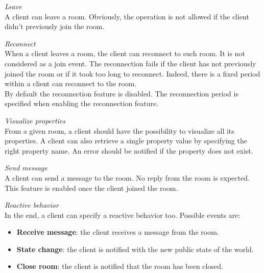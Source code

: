 \bigskip
\textit{Leave}
\\
A client can leave a room. Obviously, the operation is not allowed if the client didn't previously join the room. 

\bigskip
\textit{Reconnect}
\\
When a client leaves a room, the client can reconnect to such room. It is not considered as a join event.
The reconnection fails if the client has not previously joined the room or if it took too long to reconnect. Indeed, there is a fixed period within a client can reconnect to the room.
\\
By default the reconnection feature is disabled. The reconnection period is specified when enabling the reconnection feature.

\bigskip
\textit{Visualize properties}
\\
From a given room, a client should have the possibility to visualize all its properties. A client can also retrieve a single property value by specifying the right property name. An error should be notified if the property does not exist.

\bigskip
\textit{Send message}
\\
A client can send a message to the room. No reply from the room is expected.
This feature is enabled once the client joined the room.

\bigskip
\textit{Reactive behavior}
\\
In the end, a client can specify a reactive behavior too. Possible events are:
\begin{itemize}
\item \textbf{Receive message}: the client receives a message from the room.
\item \textbf{State change}: the client is notified with the new public state of the world.
\item \textbf{Close room}: the client is notified that the room has been closed.
\end{itemize}  
 
 
 
 
 
 
 
 
 
 

 